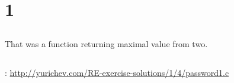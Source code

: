 \chapter{ 1}

\section{}

{That was a function returning maximal value from two}.

\section{}

: \url{http://yurichev.com/RE-exercise-solutions/1/4/password1.c}

